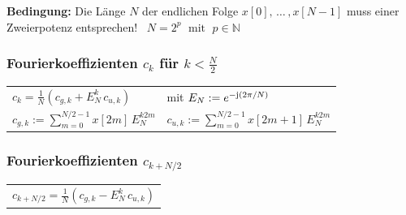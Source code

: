 \textbf{Bedingung:} Die Länge $N$ der endlichen Folge $x[0], \, \ldots \, , x[N-1]$ muss einer Zweierpotenz entsprechen! 
\textrightarrow\ $N = 2^p \; \text{ mit } \; p \in \mathbb{N}$


\subsubsection{Fourierkoeffizienten $c_k$ für $k < \frac{N}{2}$}

\vspace{-0.2cm}

\renewcommand{\arraystretch}{2.5}
\begin{tabular}{ll}
    $c_k = \frac{1}{N} \left( c_{g,k} + E_N^k \, c_{u,k} \right)$   & mit $E_N := e^{-\mathrm{j}(2 \pi/N)}$  \\
    $c_{g,k}:= \sum \limits_{m = 0}^{N/2-1} x[2m] \,  E_N^{k2m}$    & $c_{u,k}:= \sum \limits_{m = 0}^{N/2-1} x[2m+1] \,  E_N^{k2m}$
\end{tabular}


\subsubsection{Fourierkoeffizienten $c_{k + N/2}$ }

\vspace{-0.2cm}
\begin{tabular}{l}
    $c_{k + N/2} =  \frac{1}{N} \left( c_{g,k} - E_N^k \, c_{u,k} \right)$
\end{tabular}
\renewcommand{\arraystretch}{1}